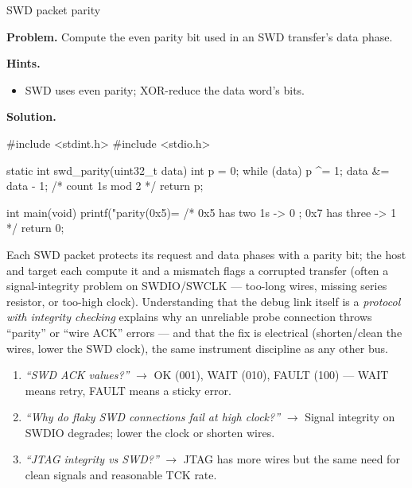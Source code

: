 \begin{gymproblem}{SWD packet parity}

\textbf{Problem.} Compute the even parity bit used in an SWD transfer's data
phase.

\textbf{Hints.}
\begin{itemize}
\item SWD uses even parity; XOR-reduce the data word's bits.
\end{itemize}

\attempt

\textbf{Solution.}
\begin{cgym}
#include <stdint.h>
#include <stdio.h>

static int swd_parity(uint32_t data) {
    int p = 0;
    while (data) { p ^= 1; data &= data - 1; }   /* count 1s mod 2 */
    return p;
}

int main(void) {
    printf("parity(0x5)=%
    /* 0x5 has two 1s -> 0 ; 0x7 has three -> 1 */
    return 0;
}
\end{cgym}

Each SWD packet protects its request and data phases with a parity bit; the host
and target each compute it and a mismatch flags a corrupted transfer (often a
signal-integrity problem on SWDIO/SWCLK --- too-long wires, missing series
resistor, or too-high clock). Understanding that the debug link itself is a
\emph{protocol with integrity checking} explains why an unreliable probe
connection throws ``parity'' or ``wire ACK'' errors --- and that the fix is
electrical (shorten/clean the wires, lower the SWD clock), the same instrument
discipline as any other bus.

\followups
\begin{enumerate}
\item \emph{``SWD ACK values?''} $\rightarrow$ OK (001), WAIT (010), FAULT (100)
  --- WAIT means retry, FAULT means a sticky error.
\item \emph{``Why do flaky SWD connections fail at high clock?''} $\rightarrow$
  Signal integrity on SWDIO degrades; lower the clock or shorten wires.
\item \emph{``JTAG integrity vs SWD?''} $\rightarrow$ JTAG has more wires but the
  same need for clean signals and reasonable TCK rate.
\end{enumerate}
\end{gymproblem}

